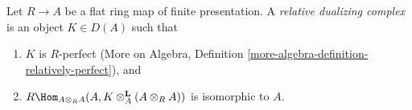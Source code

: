 \begin{definition}
\label{definition-relative-dualizing-complex}
Let $R \to A$ be a flat ring map of finite presentation.
A {\it relative dualizing complex} is an object $K \in D(A)$ such that
\begin{enumerate}
\item $K$ is $R$-perfect (More on Algebra, Definition
\ref{more-algebra-definition-relatively-perfect}), and
\item $R\Hom_{A \otimes_R A}(A, K \otimes_A^\mathbf{L} (A \otimes_R A))$
is isomorphic to $A$.
\end{enumerate}
\end{definition}